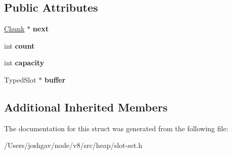 \subsection*{Public Attributes}
\begin{DoxyCompactItemize}
\item 
\hyperlink{structv8_1_1internal_1_1_typed_slot_set_1_1_chunk}{Chunk} $\ast$ {\bfseries next}\hypertarget{structv8_1_1internal_1_1_typed_slot_set_1_1_chunk_aa99dfde134c64733e2348343c0e0f8c3}{}\label{structv8_1_1internal_1_1_typed_slot_set_1_1_chunk_aa99dfde134c64733e2348343c0e0f8c3}

\item 
int {\bfseries count}\hypertarget{structv8_1_1internal_1_1_typed_slot_set_1_1_chunk_a9c1e521a7f9a738612b6ebfb512269aa}{}\label{structv8_1_1internal_1_1_typed_slot_set_1_1_chunk_a9c1e521a7f9a738612b6ebfb512269aa}

\item 
int {\bfseries capacity}\hypertarget{structv8_1_1internal_1_1_typed_slot_set_1_1_chunk_ab9e66a0d994c6a04d193e6f965fb03ee}{}\label{structv8_1_1internal_1_1_typed_slot_set_1_1_chunk_ab9e66a0d994c6a04d193e6f965fb03ee}

\item 
Typed\+Slot $\ast$ {\bfseries buffer}\hypertarget{structv8_1_1internal_1_1_typed_slot_set_1_1_chunk_a10d70d932cf59e77693cefa107b73e98}{}\label{structv8_1_1internal_1_1_typed_slot_set_1_1_chunk_a10d70d932cf59e77693cefa107b73e98}

\end{DoxyCompactItemize}
\subsection*{Additional Inherited Members}


The documentation for this struct was generated from the following file\+:\begin{DoxyCompactItemize}
\item 
/\+Users/joshgav/node/v8/src/heap/slot-\/set.\+h\end{DoxyCompactItemize}

